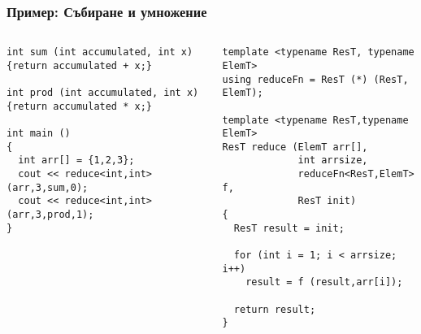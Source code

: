 \documentclass{beamer}
\begin{document}
\begin{frame}[fragile]
\frametitle{Пример: Събиране и умножение}


\begin{columns}[t]
  \begin{column}{0.55\textwidth}

\begin{flushleft}
\begin{lstlisting}
int sum (int accumulated, int x)
{return accumulated + x;}

int prod (int accumulated, int x)
{return accumulated * x;}

int main ()
{
  int arr[] = {1,2,3};
  cout << reduce<int,int> (arr,3,sum,0);
  cout << reduce<int,int> (arr,3,prod,1);
}

\end{lstlisting}  
\end{flushleft}
  \end{column}
  \begin{column}{0.45\textwidth}
\begin{flushleft}
\vspace{-30px}
\begin{lstlisting}
template <typename ResT, typename ElemT>
using reduceFn = ResT (*) (ResT, ElemT);

template <typename ResT,typename ElemT>
ResT reduce (ElemT arr[], 
             int arrsize, 
             reduceFn<ResT,ElemT> f, 
             ResT init)
{
  ResT result = init;

  for (int i = 1; i < arrsize; i++)
    result = f (result,arr[i]);

  return result;
}
\end{lstlisting}  
\end{flushleft}

  \end{column}
\end{columns}


\end{frame}
\end{document}

